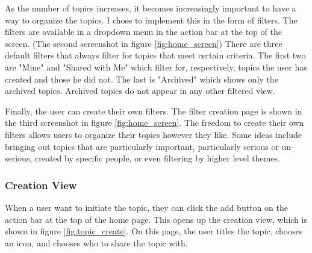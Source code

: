       As the number of topics increases,
      it becomes increasingly important to have a way to organize the topics.
      I chose to implement this in the form of filters.
      The filters are available in a dropdown menu in the action bar at the top of the screen.
      (The second screenshot in figure \ref{fig:home_screen})
      There are three default filters that always filter for topics that meet certain criteria.
      The first two are "Mine" and "Shared with Me"
      which filter for, respectively, topics the user has created and those he did not.
      The last is "Archived" which shows only the archived topics.
      Archived topics do not appear in any other filtered view.

      Finally, the user can create their own filters.
      The filter creation page is shown in the third screenshot in figure \ref{fig:home_screen}.
      The freedom to create their own filters allows users to organize
      their topics however they like.
      Some ideas include bringing out topics that are particularly important,
      particularly serious or un-serious, created by specific people,
      or even filtering by higher level themes.

      \subsubsection{Creation View}
      When a user want to initiate the topic,
      they can click the add button on the action bar at the top of the home page.
      This opens up the creation view, which is shown in figure \ref{fig:topic_create}.
      On this page, the user titles the topic,
      chooses an icon, and chooses who to share the topic with.

